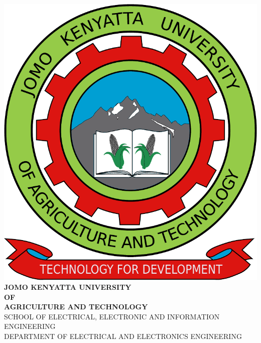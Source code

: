\begin{spacing}{1.1}
\begin{titlepage}
  \begin{center}
    \includegraphics[scale=0.2]{Graphics/jkuat-logo.pdf}\\
		\vspace{0.5cm}
		{\large\bfseries 
			JOMO KENYATTA UNIVERSITY\\[-2pt]
			OF\\[-2pt]
			AGRICULTURE AND TECHNOLOGY\\
		}
		\vspace{1cm}
		{\small
			SCHOOL OF ELECTRICAL, ELECTRONIC AND INFORMATION ENGINEERING\\
			DEPARTMENT OF ELECTRICAL AND ELECTRONICS ENGINEERING\\
}
\end{center}
\end{titlepage}
\end{spacing}
